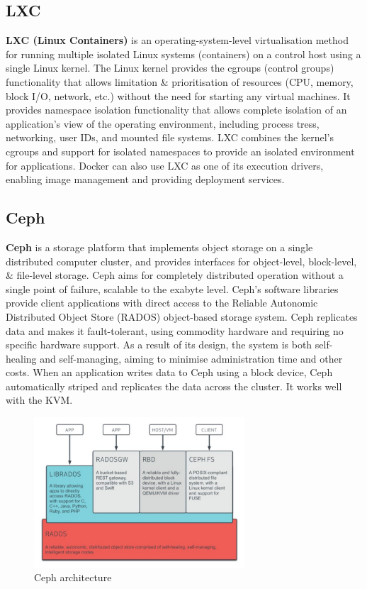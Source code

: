 \documentclass[a4paper,11pt]{article}
\begin{document}
\subsection{LXC}
\textbf{LXC (Linux Containers)} is an operating-system-level virtualisation method for running multiple isolated Linux systems (containers) on a control host using a single Linux kernel.
The Linux kernel provides the cgroups (control groups) functionality that allows limitation \& prioritisation of resources (CPU, memory, block I/O, network, etc.) without the need for starting any virtual machines.
It provides namespace isolation functionality that allows complete isolation of an application's view of the operating environment, including process tress, networking, user IDs, and mounted file systems.
LXC combines the kernel's cgroups and support for isolated namespaces to provide an isolated environment for applications.
Docker can also use LXC as one of its execution drivers, enabling image management and providing deployment services.

\subsection{Ceph}
\textbf{Ceph} is a storage platform that implements object storage on a single distributed computer cluster, and provides interfaces for object-level, block-level, \& file-level storage.
Ceph aims for completely distributed operation without a single point of failure, scalable to the exabyte level.
Ceph's software libraries provide client applications with direct access to the Reliable Autonomic Distributed Object Store (RADOS) object-based storage system.
Ceph replicates data and makes it fault-tolerant, using commodity hardware and requiring no specific hardware support.
As a result of its design, the system is both self-healing and self-managing, aiming to minimise administration time and other costs.
When an application writes data to Ceph using a block device, Ceph automatically striped and replicates the data across the cluster.
It works well with the KVM.

\begin{figure}[H]
    \centering
    \includegraphics[width=0.7\textwidth]{./images/ceph.png}
    \caption{ Ceph architecture }
\end{figure}
\end{document}
